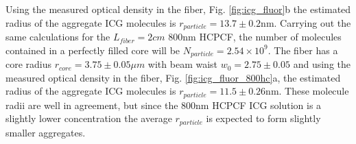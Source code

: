 Using the measured optical density in the fiber, Fig. \ref{fig:icg_fluor}b the estimated radius of the aggregate ICG molecules is $r_{particle} = 13.7 \pm 0.2$nm.
Carrying out the same calculations for the $L_{fiber}=2cm$ 800nm HCPCF, the number of molecules contained in a perfectly filled core will be $N_{particle}=2.54\times10^9$.  The fiber has a core radius $r_{core} = 3.75 \pm0.05\mu m$ with beam waist $w_0 = 2.75 \pm 0.05$ and using the measured optical density in the fiber, Fig. \ref{fig:icg_fluor_800hc}a, the estimated radius of the aggregate ICG molecules is $r_{particle} = 11.5 \pm 0.26$nm. These molecule radii are well in agreement, but since the 800nm HCPCF ICG solution is a slightly lower concentration the average $r_{particle}$ is expected to form slightly smaller aggregates.

\clearpage